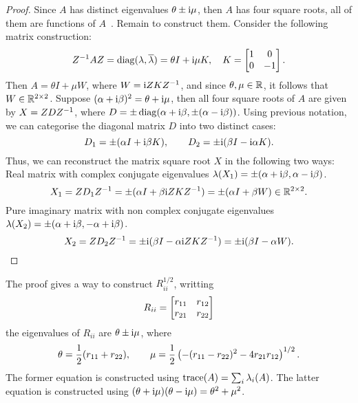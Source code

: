 \documentclass{article}
\begin{document}
\begin{proof}
  Since $A$ has distinct eigenvalues $\theta \pm \mathrm{i} \mu$, then $A$ has
  four square roots, all of them are functions of $A$~. Remain to construct them. Consider the following
  matrix construction:
  \begin{equation}\notag
    Z^{-1} A Z = \operatorname{diag}(\lambda, \overline \lambda) = \theta I + \mathrm{i} \mu K, \quad 
    K =
    \begin{bmatrix}
      1 & 0 \\ 0 & -1 
    \end{bmatrix}.
  \end{equation}
  Then $A = \theta I + \mu W$, where $W = \mathrm{i} Z K Z^{-1}$, and since
  $\theta, \mu \in \mathbb{R}$, it follows that $W \in \mathbb{R}^{2\times 2}$. Suppose
  $(\alpha + \mathrm{i} \beta)^2 = \theta + \mathrm{i} \mu$, then all four square roots
  of $A$ are given by $X = ZDZ^{-1}$, where
  $D = \pm \operatorname{diag}(\alpha + \mathrm{i} \beta, \pm (\alpha - \mathrm{i}\beta))$. Using
  previous notation, we can categorise the diagonal matrix $D$ into two
  distinct cases:
  \begin{equation}\notag
    D_1 = \pm (\alpha I + \mathrm{i} \beta K),\qquad 
    D_{2} = \pm \mathrm{i} (\beta I - \mathrm{i} \alpha K).
  \end{equation}
  Thus, we can reconstruct the matrix square root $X$ in the following two
  ways: Real matrix with complex conjugate eigenvalues
  $\lambda(X_1) = \pm(\alpha + \mathrm{i} \beta, \alpha - \mathrm{i} \beta)$.
  \begin{equation}\notag
    X_1 = ZD_1Z^{-1} = \pm (\alpha I + \beta \mathrm{i} ZKZ^{-1}) = \pm(\alpha I +
    \beta W) \in \mathbb{R}^{2\times 2}.  
  \end{equation}
  Pure imaginary matrix with non complex conjugate eigenvalues
  $\lambda(X_2) = \pm(\alpha + \mathrm{i} \beta , -\alpha + \mathrm{i} \beta)$.
  \begin{equation}\notag
    X_2 = ZD_2Z^{-1} = \pm \mathrm{i} (\beta I - \alpha \mathrm{i} ZKZ^{-1}) = \pm \mathrm{i}
    (\beta I - \alpha W).
  \end{equation}
\end{proof}

The proof gives a way to construct $R_{ii}^{1/2}$, writting
\begin{equation}\notag
  R_{ii} = 
  \begin{bmatrix}
    r_{11} & r_{12} \\ r_{21} & r_{22}
  \end{bmatrix}
\end{equation}
the eigenvalues of $R_{ii}$ are $\theta \pm \mathrm{i} \mu$, where
\begin{equation}\notag
  \theta = \frac{1}{2}(r_{11} + r_{22}),\qquad \mu = \frac{1}{2}\left(
    -(r_{11} - r_{22})^2 - 4r_{21}r_{12} \right)^{1/2}.
\end{equation}
The former equation is constructed using $\operatorname{trace}(A) = \sum_i \lambda_i(A)$.
The latter equation is constructed using
$(\theta + \mathrm{i} \mu)(\theta - \mathrm{i}\mu) = \theta^2 + \mu^2$.
\end{document}
